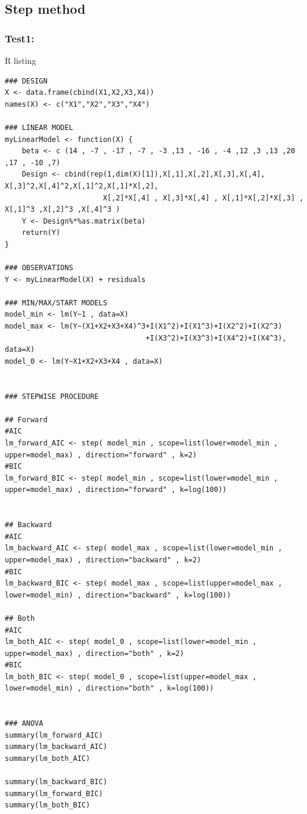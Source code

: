 \newpage
\subsection{Step method}

\subsubsection{Test1:}

R listing
\begin{lstlisting}[style=RStyle,basicstyle=\tiny]
### DESIGN
X <- data.frame(cbind(X1,X2,X3,X4))
names(X) <- c("X1","X2","X3","X4")

### LINEAR MODEL
myLinearModel <- function(X) {
    beta <- c (14 , -7 , -17 , -7 , -3 ,13 , -16 , -4 ,12 ,3 ,13 ,20 ,17 , -10 ,7)
    Design <- cbind(rep(1,dim(X)[1]),X[,1],X[,2],X[,3],X[,4], X[,3]^2,X[,4]^2,X[,1]^2,X[,1]*X[,2],
                       X[,2]*X[,4] , X[,3]*X[,4] , X[,1]*X[,2]*X[,3] , X[,1]^3 ,X[,2]^3 ,X[,4]^3 )
    Y <- Design%*%as.matrix(beta)
    return(Y)
}

### OBSERVATIONS
Y <- myLinearModel(X) + residuals

### MIN/MAX/START MODELS
model_min <- lm(Y~1 , data=X)
model_max <- lm(Y~(X1+X2+X3+X4)^3+I(X1^2)+I(X1^3)+I(X2^2)+I(X2^3)
                                 +I(X3^2)+I(X3^3)+I(X4^2)+I(X4^3), data=X)
model_0 <- lm(Y~X1+X2+X3+X4 , data=X)


### STEPWISE PROCEDURE

## Forward
#AIC
lm_forward_AIC <- step( model_min , scope=list(lower=model_min , upper=model_max) , direction="forward" , k=2)
#BIC
lm_forward_BIC <- step( model_min , scope=list(lower=model_min , upper=model_max) , direction="forward" , k=log(100))


## Backward
#AIC
lm_backward_AIC <- step( model_max , scope=list(lower=model_min , upper=model_max) , direction="backward" , k=2)
#BIC
lm_backward_BIC <- step( model_max , scope=list(upper=model_max , lower=model_min) , direction="backward" , k=log(100))

## Both
#AIC
lm_both_AIC <- step( model_0 , scope=list(lower=model_min , upper=model_max) , direction="both" , k=2)
#BIC
lm_both_BIC <- step( model_0 , scope=list(upper=model_max , lower=model_min) , direction="both" , k=log(100))


### ANOVA
summary(lm_forward_AIC)
summary(lm_backward_AIC)
summary(lm_both_AIC)

summary(lm_backward_BIC)
summary(lm_forward_BIC)
summary(lm_both_BIC)
\end{lstlisting}


